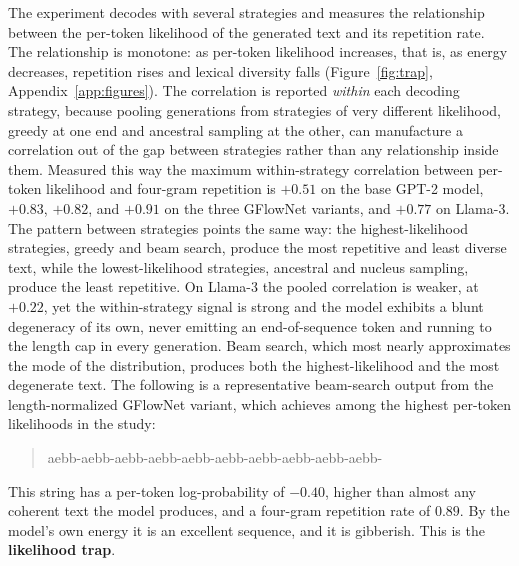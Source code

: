 The experiment decodes with several strategies and measures the relationship between the per-token likelihood of the generated text and its repetition rate. The relationship is monotone: as per-token likelihood increases, that is, as energy decreases, repetition rises and lexical diversity falls (Figure~\ref{fig:trap}, Appendix~\ref{app:figures}). The correlation is reported \emph{within} each decoding strategy, because pooling generations from strategies of very different likelihood, greedy at one end and ancestral sampling at the other, can manufacture a correlation out of the gap between strategies rather than any relationship inside them. Measured this way the maximum within-strategy correlation between per-token likelihood and four-gram repetition is $+0.51$ on the base GPT-2 model, $+0.83$, $+0.82$, and $+0.91$ on the three GFlowNet variants, and $+0.77$ on Llama-3.
The pattern between strategies points the same way: the highest-likelihood strategies, greedy and beam search, produce the most repetitive and least diverse text, while the lowest-likelihood strategies, ancestral and nucleus sampling, produce the least repetitive. On Llama-3 the pooled correlation is weaker, at $+0.22$, yet the within-strategy signal is strong and the model exhibits a blunt degeneracy of its own, never emitting an end-of-sequence token and running to the length cap in every generation.
Beam search, which most nearly approximates the mode of the distribution, produces both the highest-likelihood and the most degenerate text. The following is a representative beam-search output from the length-normalized GFlowNet variant, which achieves among the highest per-token likelihoods in the study:

\begin{quote}
\ttfamily aebb-aebb-aebb-aebb-aebb-aebb-aebb-aebb-aebb-aebb-
\end{quote}

This string has a per-token log-probability of $-0.40$, higher than almost any coherent text the model produces, and a four-gram repetition rate of $0.89$.
By the model's own energy it is an excellent sequence, and it is gibberish. This is the \textbf{likelihood trap}.

